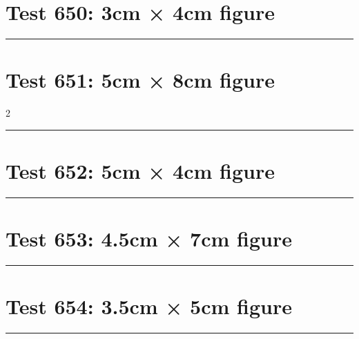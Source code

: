 \documentclass[a4paper,11pt]{article}
\begin{document}
\section*{Test 650: 3cm × 4cm figure}
\begin{swarmwrap}%
  \begin{minipage}[t]{3cm}
    \centering
    \rule{\linewidth}{4cm}
  \end{minipage}%
\end{swarmwrap}%
\swarmwrapnext
\lipsum[147]
\lipsum[148]
\lipsum[149]
\lipsum[150]
\section*{Test 651: 5cm × 8cm figure}
\begin{multicols}{2}
  \begin{swarmwrap}%
    \begin{minipage}[t]{5cm}
      \centering
      \rule{\linewidth}{8cm}
    \end{minipage}%
  \end{swarmwrap}%
  \swarmwrapnext
  \lipsum[100]
  \lipsum[101]
  \lipsum[102]
  \lipsum[103]
  \lipsum[104]
\end{multicols}
\section*{Test 652: 5cm × 4cm figure}
\begin{swarmwrap}%
  \begin{minipage}[t]{5cm}
    \centering
    \rule{\linewidth}{4cm}
  \end{minipage}%
\end{swarmwrap}%
\swarmwrapnext
\lipsum[130]
\lipsum[131]
\lipsum[132]
\section*{Test 653: 4.5cm × 7cm figure}
\begin{swarmwrap}%
  \begin{minipage}[t]{4cm}
    \centering
    \rule{\linewidth}{7cm}
  \end{minipage}%
\end{swarmwrap}%
\swarmwrapnext
\lipsum[27]
\lipsum[28]
\lipsum[29]
\section*{Test 654: 3.5cm × 5cm figure}
\begin{swarmwrap}%
  \begin{minipage}[t]{3cm}
    \centering
    \rule{\linewidth}{5cm}
  \end{minipage}%
\end{swarmwrap}%
\swarmwrapnext
\lipsum[89]
\lipsum[90]
\lipsum[91]
\end{document}
